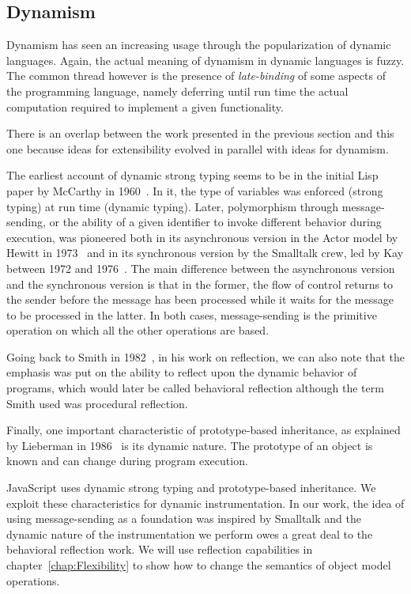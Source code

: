 \subsection{Dynamism}

Dynamism has seen an increasing usage through the popularization of dynamic
languages. Again, the actual meaning of dynamism in dynamic languages is
fuzzy. The common thread however is the presence of \textit{late-binding} of
some aspects of the programming language, namely deferring until run time the
actual computation required to implement a given functionality.

There is an overlap between the work presented in the previous section and this
one because ideas for extensibility evolved in parallel with ideas for
dynamism.

The earliest account of dynamic strong typing seems to be in the initial Lisp
paper by McCarthy in 1960~\cite{McCarthy:1960}. In it, the type of variables
was enforced (strong typing) at run time (dynamic typing). Later, polymorphism
through message-sending, or the ability of a given identifier to invoke
different behavior during execution, was pioneered both in its asynchronous
version in the Actor model by Hewitt in 1973~\cite{Hewitt:1973} and in its
synchronous version by the Smalltalk crew, led by Kay between 1972 and
1976~\cite{Kay:1993}. The main difference between the asynchronous version and
the synchronous version is that in the former, the flow of control returns to
the sender before the message has been processed while it waits for the message
to be processed in the latter. In both cases, message-sending is the primitive
operation on which all the other operations are based.

Going back to Smith in 1982~\cite{Smith:1982}, in his work on reflection, we
can also note that the emphasis was put on the ability to reflect upon the
dynamic behavior of programs, which would later be called behavioral reflection
although the term Smith used was procedural reflection.

Finally, one important characteristic of prototype-based inheritance, as
explained by Lieberman in 1986~\cite{Lieberman:1986} is its dynamic nature. The
prototype of an object is known and can change during program execution.

JavaScript uses dynamic strong typing and prototype-based inheritance.  We
exploit these characteristics for dynamic instrumentation. In our work, the
idea of using message-sending as a foundation was inspired by Smalltalk  and
the dynamic nature of the instrumentation we perform owes a great deal to the
behavioral reflection work. We will use reflection capabilities in
chapter~\ref{chap:Flexibility} to show how to change the semantics of object
model operations.

